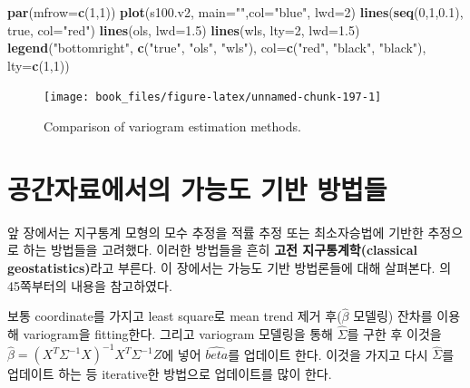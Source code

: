 \documentclass[b5paper,]{scrbook}
\makeatletter
\newenvironment{Shaded}{\begin{snugshade}}{\end{snugshade}}
\newcommand{\KeywordTok}[1]{\textcolor[rgb]{0.13,0.29,0.53}{\textbf{{#1}}}}
\newcommand{\DataTypeTok}[1]{\textcolor[rgb]{0.13,0.29,0.53}{{#1}}}
\newcommand{\DecValTok}[1]{\textcolor[rgb]{0.00,0.00,0.81}{{#1}}}
\newcommand{\FloatTok}[1]{\textcolor[rgb]{0.00,0.00,0.81}{{#1}}}
\newcommand{\StringTok}[1]{\textcolor[rgb]{0.31,0.60,0.02}{{#1}}}
\newcommand{\NormalTok}[1]{{#1}}
\theoremstyle{plain}
\theoremstyle{definition}
\numberwithin{equation}{section}
\newenvironment{kframe}{%
\medskip{}
\setlength{\fboxsep}{.8em}
 \def\at@end@of@kframe{}%
 \ifinner\ifhmode%
  \def\at@end@of@kframe{\end{minipage}}%
  \begin{minipage}{\columnwidth}%
 \fi\fi%
 \def\FrameCommand##1{\hskip\@totalleftmargin \hskip-\fboxsep
 \colorbox{shadecolor}{##1}\hskip-\fboxsep
     \hskip-\linewidth \hskip-\@totalleftmargin \hskip\columnwidth}%
 \MakeFramed {\advance\hsize-\width
   \@totalleftmargin\z@ \linewidth\hsize
   \@setminipage}}%
 {\par\unskip\endMakeFramed%
 \at@end@of@kframe}
\renewenvironment{Shaded}{\begin{kframe}}{\end{kframe}}
\makeatother
\begin{document}
\begin{Shaded}
\begin{Highlighting}[]
\KeywordTok{par}\NormalTok{(}\DataTypeTok{mfrow=}\KeywordTok{c}\NormalTok{(}\DecValTok{1}\NormalTok{,}\DecValTok{1}\NormalTok{))}
\KeywordTok{plot}\NormalTok{(s100.v2, }\DataTypeTok{main=}\StringTok{""}\NormalTok{,}\DataTypeTok{col=}\StringTok{"blue"}\NormalTok{, }\DataTypeTok{lwd=}\DecValTok{2}\NormalTok{)}
\KeywordTok{lines}\NormalTok{(}\KeywordTok{seq}\NormalTok{(}\DecValTok{0}\NormalTok{,}\DecValTok{1}\NormalTok{,}\FloatTok{0.1}\NormalTok{), true, }\DataTypeTok{col=}\StringTok{"red"}\NormalTok{)}
\KeywordTok{lines}\NormalTok{(ols, }\DataTypeTok{lwd=}\FloatTok{1.5}\NormalTok{)}
\KeywordTok{lines}\NormalTok{(wls, }\DataTypeTok{lty=}\DecValTok{2}\NormalTok{, }\DataTypeTok{lwd=}\FloatTok{1.5}\NormalTok{)}
\KeywordTok{legend}\NormalTok{(}\StringTok{"bottomright"}\NormalTok{, }\KeywordTok{c}\NormalTok{(}\StringTok{"true"}\NormalTok{, }\StringTok{"ols"}\NormalTok{, }\StringTok{"wls"}\NormalTok{),}
       \DataTypeTok{col=}\KeywordTok{c}\NormalTok{(}\StringTok{"red"}\NormalTok{, }\StringTok{"black"}\NormalTok{, }\StringTok{"black"}\NormalTok{), }\DataTypeTok{lty=}\KeywordTok{c}\NormalTok{(}\DecValTok{1}\NormalTok{,}\DecValTok{1}\NormalTok{))}
\end{Highlighting}
\end{Shaded}

\begin{figure}

{\centering \texttt{[image: book\_files/figure-latex/unnamed-chunk-197-1]} 

}

\caption{Comparison of variogram estimation methods.}\label{fig:unnamed-chunk-197}
\end{figure}

\chapter{공간자료에서의 가능도 기반 방법들}\label{spatlikelihood}

앞 장에서는 지구통계 모형의 모수 추정을 적률 추정 또는 최소자승법에
기반한 추정으로 하는 방법들을 고려했다. 이러한 방법들을 흔히
\textbf{고전 지구통계학(classical geostatistics)}라고 부른다. 이
장에서는 가능도 기반 방법론들에 대해 살펴본다. \citep{Gelfand2010}의
45쪽부터의 내용을 참고하였다.

보통 coordinate를 가지고 least square로 mean trend 제거
후(\(\hat{\beta}\) 모델링) 잔차를 이용해 variogram을 fitting한다. 그리고
variogram 모델링을 통해 \(\hat{\Sigma}\)를 구한 후 이것을
\(\hat{\beta}=(X^{T}\Sigma^{-1}X)^{-1}X^{T}\Sigma^{-1}Z\)에 넣어
\(\hat{beta}\)를 업데이트 한다. 이것을 가지고 다시 \(\hat{\Sigma}\)를
업데이트 하는 등 iterative한 방법으로 업데이트를 많이 한다.
\end{document}
